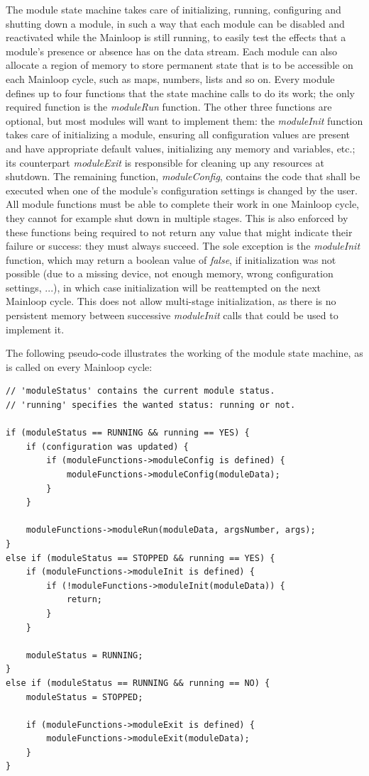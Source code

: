\documentclass[a4paper,12pt]{report}
\begin{document}
The module state machine takes care of initializing, running, configuring and shutting down a module, in such a way that each module can be disabled and reactivated while the Mainloop is still running, to easily test the effects that a module's presence or absence has on the data stream.
Each module can also allocate a region of memory to store permanent state that is to be accessible on each Mainloop cycle, such as maps, numbers, lists and so on.
Every module defines up to four functions that the state machine calls to do its work; the only required function is the \emph{moduleRun} function. The other three functions are optional, but most modules will want to implement them: the \emph{moduleInit} function takes care of initializing a module, ensuring all configuration values are present and have appropriate default values, initializing any memory and variables, etc.; its counterpart \emph{moduleExit} is responsible for cleaning up any resources at shutdown. The remaining function, \emph{moduleConfig}, contains the code that shall be executed when one of the module's configuration settings is changed by the user.
All module functions must be able to complete their work in one Mainloop cycle, they cannot for example shut down in multiple stages. This is also enforced by these functions being required to not return any value that might indicate their failure or success: they must always succeed. The sole exception is the \emph{moduleInit} function, which may return a boolean value of \emph{false}, if initialization was not possible (due to a missing device, not enough memory, wrong configuration settings, ...), in which case initialization will be reattempted on the next Mainloop cycle. This does not allow multi-stage initialization, as there is no persistent memory between successive \emph{moduleInit} calls that could be used to implement it.

The following pseudo-code illustrates the working of the module state machine, as is called on every Mainloop cycle:

\begin{lstlisting}
// 'moduleStatus' contains the current module status.
// 'running' specifies the wanted status: running or not.

if (moduleStatus == RUNNING && running == YES) {
    if (configuration was updated) {
        if (moduleFunctions->moduleConfig is defined) {
            moduleFunctions->moduleConfig(moduleData);
        }
    }

    moduleFunctions->moduleRun(moduleData, argsNumber, args);
}
else if (moduleStatus == STOPPED && running == YES) {
    if (moduleFunctions->moduleInit is defined) {
        if (!moduleFunctions->moduleInit(moduleData)) {
            return;
        }
    }

    moduleStatus = RUNNING;
}
else if (moduleStatus == RUNNING && running == NO) {
    moduleStatus = STOPPED;

    if (moduleFunctions->moduleExit is defined) {
        moduleFunctions->moduleExit(moduleData);
    }
}
\end{lstlisting}
\end{document}
